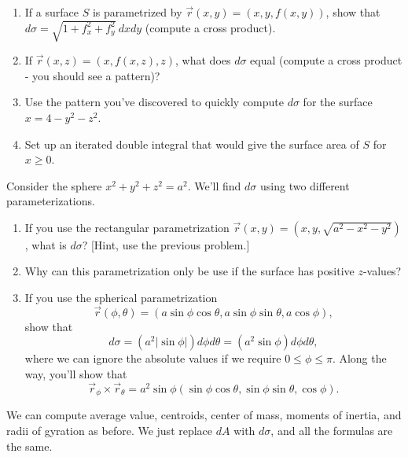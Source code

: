 \begin{problem}
\begin{enumerate}
	\item If a surface $S$ is parametrized by $\vec r(x,y) = (x,y,f(x,y))$, show that $d\sigma = \sqrt{1+f_x^2+f_y^2}\ dxdy$ (compute a cross product).  
	\item If $\vec r(x,z) = (x,f(x,z),z)$, what does $d\sigma$ equal (compute a cross product - you should see a pattern)?
	\item Use the pattern you've discovered to quickly compute $d\sigma$ for the surface $x=4-y^2-z^2$.
	\item Set up an iterated double integral that would give the surface area of $S$ for $x\geq 0$. 
\end{enumerate}
\end{problem}


\begin{problem}\label{sphere surface area element}
 Consider the sphere $x^2+y^2+z^2=a^2$.  We'll find $d\sigma$ using two different parameterizations.
 \begin{enumerate}
  \item If you use the rectangular parametrization $\vec r(x,y) = (x,y,\sqrt{a^2-x^2-y^2})$, what is $d\sigma$? [Hint, use the previous problem.] 
	\item Why can this parametrization only be use if the surface has positive $z$-values?
  \item {} If you use the spherical parametrization $$\vec r(\phi,\theta) = (a\sin\phi\cos\theta,a\sin\phi\sin\theta,a\cos\phi),$$ show that $$d\sigma = (a^2|\sin\phi|)d\phi d\theta= (a^2\sin\phi) d\phi d\theta,$$ where we can ignore the absolute values if we require $0\leq \phi\leq \pi$. Along the way, you'll show that 
$$ \vec r_\phi\times \vec r_\theta = a^2\sin \phi (\sin\phi\cos\theta,\sin\phi\sin\theta,\cos\phi).$$
 \end{enumerate}
\end{problem}

We can compute average value, centroids, center of mass, moments of inertia, and radii of gyration as before.  We just replace $dA$ with $d\sigma$, and all the formulas are the same. 


